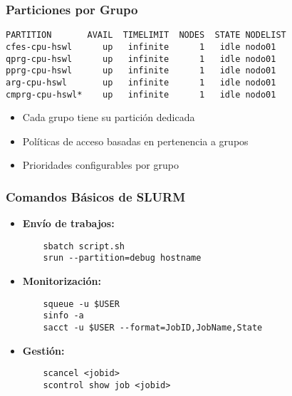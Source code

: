 \documentclass[aspectratio=169]{beamer}
\begin{document}
\begin{frame}[fragile]
\frametitle{Particiones por Grupo}
\begin{verbatim}
PARTITION       AVAIL  TIMELIMIT  NODES  STATE NODELIST
cfes-cpu-hswl      up   infinite      1   idle nodo01
qprg-cpu-hswl      up   infinite      1   idle nodo01
pprg-cpu-hswl      up   infinite      1   idle nodo01
arg-cpu-hswl       up   infinite      1   idle nodo01
cmprg-cpu-hswl*    up   infinite      1   idle nodo01
\end{verbatim}

\begin{itemize}
    \item Cada grupo tiene su partición dedicada
    \item Políticas de acceso basadas en pertenencia a grupos
    \item Prioridades configurables por grupo
\end{itemize}
\end{frame}

\begin{frame}[fragile]
\frametitle{Comandos Básicos de SLURM}
\begin{itemize}
    \item \textbf{Envío de trabajos:} 
    \begin{verbatim}
    sbatch script.sh
    srun --partition=debug hostname
    \end{verbatim}
    
    \item \textbf{Monitorización:}
    \begin{verbatim}
    squeue -u $USER
    sinfo -a
    sacct -u $USER --format=JobID,JobName,State
    \end{verbatim}
    
    \item \textbf{Gestión:}
    \begin{verbatim}
    scancel <jobid>
    scontrol show job <jobid>
    \end{verbatim}
\end{itemize}
\end{frame}
\end{document}
